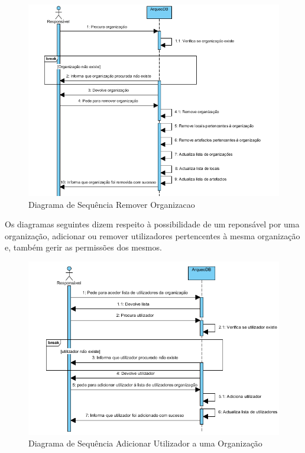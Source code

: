 \documentclass[12pt,a4paper]{article}
\begin{document}
\begin{figure}[h!]
\centering
\includegraphics[scale=1]{sequencia/removerorganizacao}
\caption{Diagrama de Sequência Remover Organizacao} 
\end{figure}

\clearpage
Os diagramas seguintes dizem respeito à possibilidade de um reponsável por uma organização, adicionar ou remover utilizadores pertencentes à mesma organização e, também gerir as permissões dos mesmos.\\

\begin{figure}[h!]
\centering
\includegraphics[scale=1]{sequencia/adicionarutilizador}
\caption{Diagrama de Sequência Adicionar Utilizador a uma Organização} 
\end{figure}  
\end{document}
